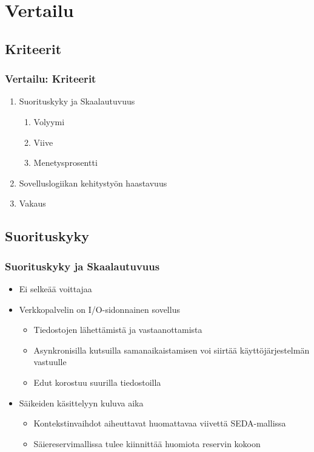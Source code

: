 \documentclass{beamer}
\begin{document}
\section{Vertailu}
\subsection{Kriteerit}
\begin{frame}
    \frametitle{Vertailu: Kriteerit}
    \begin{enumerate}
        \item Suorituskyky ja Skaalautuvuus
            \begin{enumerate}
                \item Volyymi
                \item Viive
                \item Menetysprosentti
            \end{enumerate}
        \item Sovelluslogiikan kehitystyön haastavuus
        \item Vakaus
    \end{enumerate}
\end{frame}
\subsection{Suorituskyky}
\begin{frame}
    \frametitle{Suorituskyky ja Skaalautuvuus}
    \begin{itemize}
        \item Ei selkeää voittajaa
        \item Verkkopalvelin on I/O-sidonnainen sovellus
            \begin{itemize}
                \item Tiedostojen lähettämistä ja vastaanottamista 
                \item Asynkronisilla kutsuilla samanaikaistamisen
                    voi siirtää käyttöjärjestelmän vastuulle
                \item Edut korostuu suurilla tiedostoilla
            \end{itemize}
        \item Säikeiden käsittelyyn kuluva aika
            \begin{itemize}
                \item Kontekstinvaihdot aiheuttavat huomattavaa viivettä
                    SEDA-mallissa
                \item Säiereservimallissa tulee kiinnittää huomiota reservin kokoon
            \end{itemize}
    \end{itemize}
\end{frame}
\end{document}

